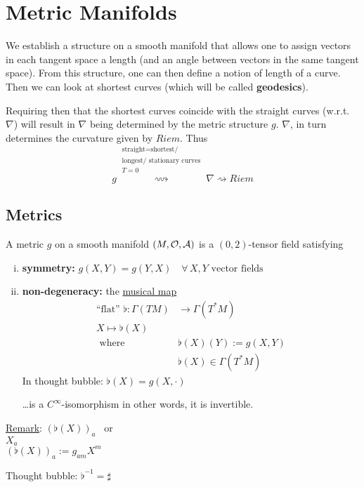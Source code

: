 \section{Metric Manifolds}
We establish a structure on a smooth manifold that allows one to assign vectors in each tangent space a length (and an angle between vectors in the same tangent space). From this structure, one can then define a notion of length of a curve. Then we can look at shortest curves (which will be called \textbf{geodesics}).

Requiring then that the shortest curves coincide with the straight curves (w.r.t. $\nabla$) will result in $\nabla$ being determined by the metric structure $g$. $\nabla$, in turn determines the curvature given by $Riem$. Thus
\[
g  \overset{\substack{\text{straight} = \text{shortest/} \\ \text{longest/ stationary curves} \\ T =0}}{\rightsquigarrow}  \nabla \rightsquigarrow Riem
\]

\subsection{Metrics}
\begin{definition}
  A metric $g$ on a smooth manifold $(M, \mathcal{O}, \mathcal{A})$ is a $(0,2)$-tensor field satisfying
\begin{enumerate}[(i)]
\item \textbf{symmetry: }$g(X,Y) = g(Y,X) \quad \forall \, X, Y \text{ vector fields}$
\item \textbf{non-degeneracy: }the \underline{musical map}
\begin{align*}
  \text{``flat''} \, \,  \flat : \Gamma(TM) & \to \Gamma(T^*M) \\ 
  X \mapsto \flat(X) \\
\text{ where } & \flat(X)(Y):= g(X,Y) \\
  & \flat(X) \in \Gamma(T^*M)
\end{align*}
In thought bubble: $\flat(X) = g(X,\cdot)$

\dots is a $C^{\infty}$-isomorphism in other words, it is invertible.
\end{enumerate}
\end{definition}

\underline{Remark}: $(\flat(X))_a$ \quad \, or \\
$X_a$ \\
$(\flat(X))_a := g_{am} X^m$

Thought bubble: $\flat^{-1} = \sharp$

